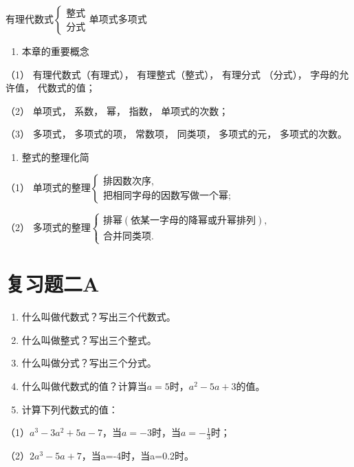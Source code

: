 有理代数式\(\left\{ \begin{array}{l} \text{整式} \\ \text{分式} \end{array} \right.\)单项式多项式

\begin{enumerate}[start=3]
\item
  本章的重要概念
\end{enumerate}

（1） 有理代数式（有理式）， 有理整式（整式）， 有理分式 （分式），
字母的允许值， 代数式的值；

（2） 单项式， 系数， 幂， 指数， 单项式的次数；

（3） 多项式， 多项式的项， 常数项， 同类项， 多项式的元，
多项式的次数。

\begin{enumerate}[start=4]
\item
  整式的整理化简
\end{enumerate}

（1）
单项式的整理\(\left\{\begin{array}{l} \text{排因数次序}, \\ \text{把相同字母的因数写做一个幂}; \end{array}\right.\)

（2）
多项式的整理\(\left\{\begin{array}{l} \text{排幂}(\text{依某一字母的降幂或升幂排列}), \\ \text{合并同类项}. \end{array}\right.\)

\section{复习题二A}

\begin{enumerate}
\item
  什么叫做代数式？写出三个代数式。
\item
  什么叫做整式？写出三个整式。
\item
  什么叫做分式？写出三个分式。
\item
  什么叫做代数式的值？计算当\(a = 5\)时，\(a^2 - 5a + 3\)的值。
\item
  计算下列代数式的值：
\end{enumerate}

（1）\(a^3 - 3a^2 + 5a - 7\)，当\(a = -3\)时，当\(a = -\frac{1}{3}\)时；

（2）\(2a^{3}-5a+7\)，当a=-4时，当a=0.2时。

